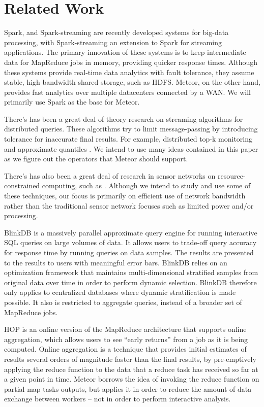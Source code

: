 \section{Related Work}

Spark, and Spark-streaming \cite{spark} are recently developed systems for big-data processing, with Spark-streaming an extension to Spark for streaming applications. The primary innovation of these systems is to keep intermediate data for MapReduce jobs in memory, providing quicker response times. Although these systems provide real-time data analytics with fault tolerance, they assume stable, high bandwidth shared storage, such as HDFS. Meteor, on the other hand, provides fast analytics over multiple datacenters connected by a WAN. We will primarily use Spark as the base for Meteor.  

There’s has been a great deal of theory research on streaming algorithms for distributed queries. These algorithms try to limit message-passing by introducing tolerance for inaccurate final results. For example, distributed top-k monitoring \cite{topk} and approximate quantiles \cite{approxquant}. We intend to use many ideas contained in this paper as we figure out the operators that Meteor should support. 

There’s has also been a great deal of research in sensor networks on resource-constrained computing, such as \cite{tag}. Although we intend to study and use some of these techniques, our focus is primarily on efficient use of network bandwidth rather than the traditional sensor network focuses such as limited power and/or processing.  

BlinkDB \cite{blinkdb} is a massively parallel approximate query engine for running interactive SQL queries on large volumes of data. It allows users to trade-off query accuracy for response time by running queries on data samples. The results are presented to the results to users with meaningful error bars. BlinkDB relies on an optimization framework that maintains multi-dimensional stratified samples from original data over time in order to perform dynamic selection. BlinkDB therefore only applies to centralized databases where dynamic stratification is made possible. It also is restricted to aggregate queries, instead of a broader set of MapReduce jobs.

HOP \cite{hop} is an online version of the MapReduce architecture that supports online aggregation, which allows users to see “early returns” from a job as it is being computed. Online aggregation is a technique that provides initial estimates of results several orders of magnitude faster than the final results, by pre-emptively applying the reduce function to the data that a reduce task has received so far at a given point in time. Meteor borrows the idea of  invoking the reduce function on partial map tasks outputs, but applies it in order to reduce the amount of data exchange between workers – not in order to perform interactive analysis.